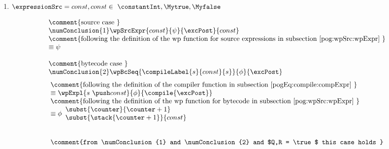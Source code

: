 \begin{enumerate} 
		\item    $\expressionSrc = const , const \in \ \constantInt, \Mytrue, \Myfalse $
                     
		     $$ \begin{array}{l}  
		               \mbox{\rm\comment{source case }} \\
		              \numConclusion{1} \wpSrcExpr{ const}{\psi}{ \excPost}{const}  \\
		    	       \mbox{\rm\comment{following the definition of the wp function for source expressions in subsection  \ref{pog:wpSrc:wpExpr} }} \\
			       \equiv \psi \\
			       \\
			       \mbox{\rm\comment{bytecode case }} \\
		               \numConclusion{2} \wpBcSeq{\compileLabel{s}{const}{s} }{\phi}{ \excPost}  \\
			\end{array}$$ 
                       $$ \begin{array}{l}  
		               
		    	       \mbox{\rm\comment{following the definition   of the compiler function in subsection \ref{pogEq:compile:compExpr} }} \\
			       \equiv \wpExpl{s \ \push const }{\phi}{ \compile{\excPost}}  \\
			       \mbox{\rm\comment{following the definition of the wp function for bytecode in subsection \ref{pog:wpSrc:wpExpr}  }} \\
			       \equiv \phi \begin{array}{l}
                                                \subst{ \counter }{ \counter + 1}\\
						\subst{\stack{ \counter +1} }{const  }
					    \end{array} \\
			        \\
				\\
				 \mbox{\rm\comment{from \numConclusion{1} and   \numConclusion{2} and $Q,R = \true $ this case holds   }} \\
					 
				    
			\end{array}$$
                        
			
			

\end{enumerate}
